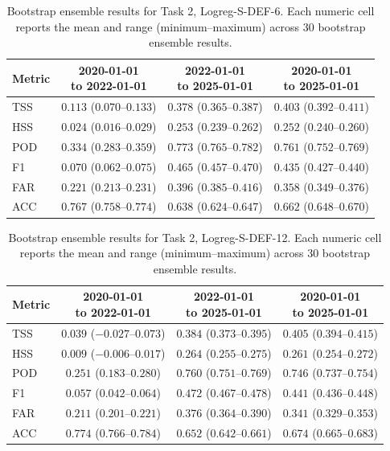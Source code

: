 \begin{table}[htbp]
\centering
\small
\caption{Bootstrap ensemble results for Task 2, Logreg-S-DEF-6. Each numeric cell reports the mean and range (minimum--maximum) across 30 bootstrap ensemble results.}
\label{tab:app-task2-logreg-s-def-6}
\begin{tabular}{lccc}
\toprule
Metric & \shortstack{2020-01-01\\to 2022-01-01} & \shortstack{2022-01-01\\to 2025-01-01} & \shortstack{2020-01-01\\to 2025-01-01} \\
\midrule
TSS & $0.113$ ($0.070$--$0.133$) & $0.378$ ($0.365$--$0.387$) & $0.403$ ($0.392$--$0.411$) \\
HSS & $0.024$ ($0.016$--$0.029$) & $0.253$ ($0.239$--$0.262$) & $0.252$ ($0.240$--$0.260$) \\
POD & $0.334$ ($0.283$--$0.359$) & $0.773$ ($0.765$--$0.782$) & $0.761$ ($0.752$--$0.769$) \\
F1 & $0.070$ ($0.062$--$0.075$) & $0.465$ ($0.457$--$0.470$) & $0.435$ ($0.427$--$0.440$) \\
FAR & $0.221$ ($0.213$--$0.231$) & $0.396$ ($0.385$--$0.416$) & $0.358$ ($0.349$--$0.376$) \\
ACC & $0.767$ ($0.758$--$0.774$) & $0.638$ ($0.624$--$0.647$) & $0.662$ ($0.648$--$0.670$) \\
\bottomrule
\end{tabular}
\end{table}
\clearpage

\begin{table}[htbp]
\centering
\small
\caption{Bootstrap ensemble results for Task 2, Logreg-S-DEF-12. Each numeric cell reports the mean and range (minimum--maximum) across 30 bootstrap ensemble results.}
\label{tab:app-task2-logreg-s-def-12}
\begin{tabular}{lccc}
\toprule
Metric & \shortstack{2020-01-01\\to 2022-01-01} & \shortstack{2022-01-01\\to 2025-01-01} & \shortstack{2020-01-01\\to 2025-01-01} \\
\midrule
TSS & $0.039$ ($-0.027$--$0.073$) & $0.384$ ($0.373$--$0.395$) & $0.405$ ($0.394$--$0.415$) \\
HSS & $0.009$ ($-0.006$--$0.017$) & $0.264$ ($0.255$--$0.275$) & $0.261$ ($0.254$--$0.272$) \\
POD & $0.251$ ($0.183$--$0.280$) & $0.760$ ($0.751$--$0.769$) & $0.746$ ($0.737$--$0.754$) \\
F1 & $0.057$ ($0.042$--$0.064$) & $0.472$ ($0.467$--$0.478$) & $0.441$ ($0.436$--$0.448$) \\
FAR & $0.211$ ($0.201$--$0.221$) & $0.376$ ($0.364$--$0.390$) & $0.341$ ($0.329$--$0.353$) \\
ACC & $0.774$ ($0.766$--$0.784$) & $0.652$ ($0.642$--$0.661$) & $0.674$ ($0.665$--$0.683$) \\
\bottomrule
\end{tabular}
\end{table}
\clearpage

